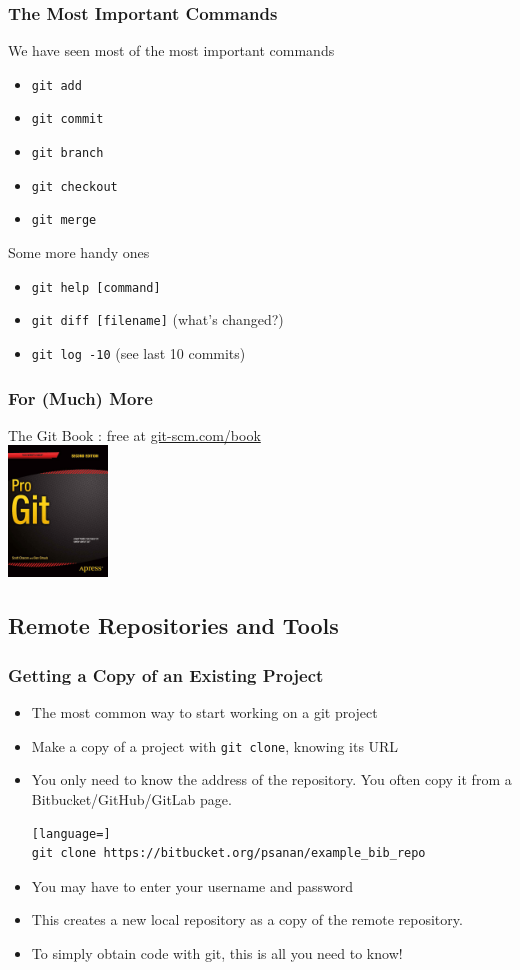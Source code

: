 \begin{frame}[fragile]
\frametitle{The Most Important Commands}
We have seen most of the most important commands
\begin{itemize}
\item \lstinline{git add}
\item \lstinline{git commit}
\item \lstinline{git branch}
\item \lstinline{git checkout}
\item \lstinline{git merge}
\end{itemize}

Some more handy ones
\begin{itemize}
\item \lstinline{git help [command]}
\item \lstinline{git diff [filename]} (what's changed?)
\item \lstinline{git log -10} (see last 10 commits)
\end{itemize}
\end{frame}

\begin{frame}[fragile]
\frametitle{For (Much) More}
The Git Book : free at \href{https://git-scm.com/book}{git-scm.com/book} \\
\includegraphics[width=100px]{progit2}
\end{frame}

\subsection{Remote Repositories and Tools}

\begin{frame}[fragile]
\frametitle{Getting a Copy of an Existing Project}
\begin{itemize}
\item
The most common way to start working on a git project
\item Make a copy of a project with \lstinline{git clone}, knowing its URL
\item You only need to know the address of the repository. You often copy it from a Bitbucket/GitHub/GitLab page.
\begin{lstlisting}[language=]
git clone https://bitbucket.org/psanan/example_bib_repo
\end{lstlisting}
\item You may have to enter your username and password
\item This creates a new local repository as a copy of the remote repository.
\item To simply obtain code with git, this is all you need to know!
\end{itemize}
\end{frame}

